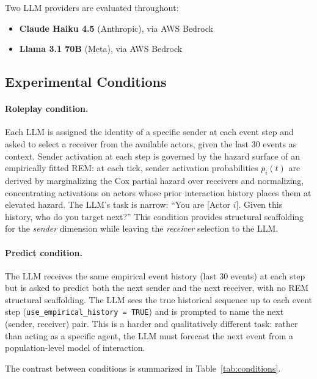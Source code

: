 \documentclass[11pt]{article}
\begin{document}
Two LLM providers are evaluated throughout:
\begin{itemize}[leftmargin=2em]
  \item \textbf{Claude Haiku 4.5} (Anthropic), via AWS Bedrock
  \item \textbf{Llama 3.1 70B} (Meta), via AWS Bedrock
\end{itemize}

\subsection{Experimental Conditions}

\paragraph{Roleplay condition.}
Each LLM is assigned the identity of a specific sender at each event step and
asked to select a receiver from the available actors, given the last 30 events
as context. Sender activation at each step is governed by the hazard surface
of an empirically fitted REM: at each tick, sender activation probabilities
$p_i(t)$ are derived by marginalizing the Cox partial hazard over receivers
and normalizing, concentrating activations on actors whose prior interaction
history places them at elevated hazard. The LLM's task is narrow: ``You are
[Actor $i$]. Given this history, who do you target next?'' This condition
provides structural scaffolding for the \emph{sender} dimension while leaving
the \emph{receiver} selection to the LLM.

\paragraph{Predict condition.}
The LLM receives the same empirical event history (last 30 events) at each
step but is asked to predict both the next sender and the next receiver,
with no REM structural scaffolding. The LLM sees the true historical sequence
up to each event step (\texttt{use\_empirical\_history = TRUE}) and is prompted
to name the next (sender, receiver) pair. This is a harder and qualitatively
different task: rather than acting as a specific agent, the LLM must forecast
the next event from a population-level model of interaction.

The contrast between conditions is summarized in
Table~\ref{tab:conditions}.
\end{document}
